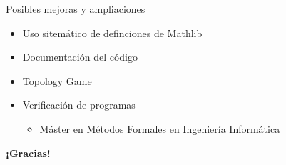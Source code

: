 \documentclass{beamer}
\begin{document}
\begin{frame}{Posibles mejoras y ampliaciones}
  
  \begin{itemize}
    \item Uso sitemático de definciones de Mathlib
    \item Documentación del código
    \item Topology Game
    \item Verificación de programas
    \begin{itemize}
      \item Máster en Métodos Formales en Ingeniería Informática
    \end{itemize}
  \end{itemize}

\end{frame}


\begin{frame}
  \centering
  \Huge
  \textbf{¡Gracias!}

  \vspace{1cm}

  \Large \insertshorttitle

  \Large \insertshortsubtitle

  \vspace{0.5cm}

  \large \insertauthor


\end{frame}
\end{document}
